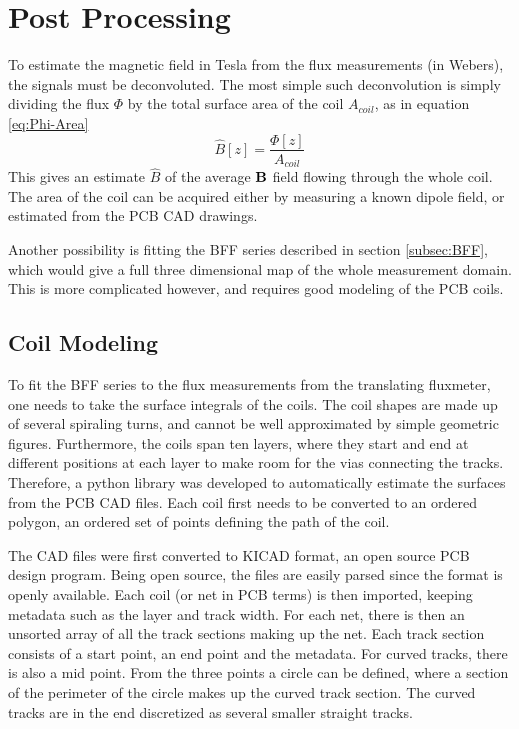 \chapter{Post Processing}
To estimate the magnetic field in Tesla from the flux measurements
(in Webers), the signals must be deconvoluted. The most simple
such deconvolution is simply dividing the flux $\Phi$ by the total surface
area of the coil $A_{coil}$, as in equation \ref{eq:Phi-Area}
\begin{equation}
    \hat{B}[z] = \frac{\Phi[z]}{A_{coil}}
    \label{eq:Phi-Area}
\end{equation}
This gives an estimate $\hat{B}$ of the average $\vb{B}$ field
flowing through the whole coil. The area of the coil can be acquired
either by measuring a known dipole field, or estimated from the
PCB CAD drawings.

Another possibility is fitting the BFF series described in section
\ref{subsec:BFF}, which would give a full three dimensional map of
the whole measurement domain. This is more complicated however,
and requires good modeling of the PCB coils.

\section{Coil Modeling}
\label{sec:coil-modeling}
To fit the BFF series to the flux measurements from the translating
fluxmeter, one needs to take the surface integrals of the coils.
The coil shapes are made up of several spiraling turns, and cannot be
well approximated by simple geometric figures.
Furthermore, the coils span ten layers,
where they start and end at different positions at each layer to make
room for the vias connecting the tracks. Therefore, a python library
was developed to automatically estimate the surfaces from the
PCB CAD files. Each coil first needs to be converted to an
ordered polygon, an ordered set of points defining the path
of the coil.

The CAD files were first converted to KICAD format, an open source
PCB design program. Being open source, the files are easily parsed
since the format is openly available. \cite{noauthor_board_nodate}
Each coil (or net in PCB terms) is then imported, keeping metadata such as
the layer and track width. For each net, there is then an unsorted
array of all the track sections making up the net. Each track
section consists of a start point, an end point and the metadata.
For curved tracks, there is also a mid point. From the three points
a circle can be defined, where a section of the perimeter of the
circle makes up the curved track section. The curved tracks are in the
end discretized as several smaller straight tracks.

